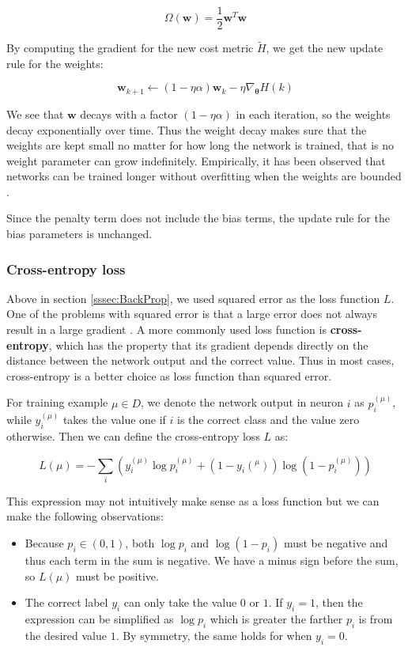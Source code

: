 \[
\Omega(\mathbf{w}) = \frac{1}{2} \mathbf{w}^T \mathbf{w}
\]

By computing the gradient for the new cost metric $\tilde{H}$, we get the new update rule for the weights:

\[
\mathbf{w}_{k+1} \leftarrow
(1 - \eta \alpha) \mathbf{w}_k - \eta \nabla_{\mathbf{\theta}} H(k)
\]

We see that $\mathbf{w}$ decays with a factor $(1 - \eta \alpha)$ in each iteration, so the weights decay exponentially over time. Thus the weight decay makes sure that the weights are kept small no matter for how long the network is trained, that is no weight parameter can grow indefinitely. Empirically, it has been observed that networks can be trained longer without overfitting when the weights are bounded \cite[Chapter~3]{NielsenBook}.

Since the penalty term does not include the bias terms, the update rule for the bias parameters is unchanged.


\subsubsection{Cross-entropy loss} \label{sssec:CrossEntropy}

Above in section \ref{sssec:BackProp}, we used squared error as the loss function $L$. One of the problems with squared error is that a large error does not always result in a large gradient \cite[Chapter~3]{NielsenBook}.
A more commonly used loss function is \textbf{cross-entropy}, which has the property that its gradient depends directly on the distance between the network output and the correct value.
Thus in most cases, cross-entropy is a better choice as loss function than squared error.

For training example $\mu \in D$, we denote the network output in neuron $i$ as $p_i^(\mu)$, while $y_i^(\mu)$ takes the value one if $i$ is the correct class and the value zero otherwise. Then we can define the cross-entropy loss $L$ as:

\[
L(\mu) = - \sum_i \left(
  y_i^(\mu) \log p_i^(\mu) + (1 - y_i(^\mu)) \log (1 - p_i^(\mu))
\right)
\]

This expression may not intuitively make sense as a loss function but we can make the following observations:

\begin{itemize}
    \item Because $p_i \in (0, 1)$, both $\log p_i$ and $\log (1 - p_i)$ must be negative and thus each term in the sum is negative. We have a minus sign before the sum, so $L(\mu)$ must be positive.
    \item The correct label $y_i$ can only take the value $0$ or $1$. If $y_i=1$, then the expression can be simplified as $\log p_i$ which is greater the farther $p_i$ is from the desired value $1$. By symmetry, the same holds for when $y_i = 0$.
\end{itemize}

